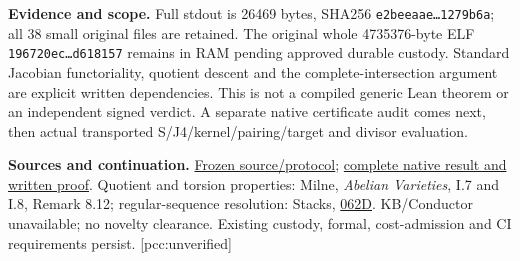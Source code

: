 \documentclass[10pt,a4paper]{article}
\begin{document}
\textbf{Evidence and scope.} Full stdout is 26469 bytes, SHA256
\texttt{e2beeaae\ldots1279b6a}; all 38 small original files are retained.
The original whole 4735376-byte ELF
\texttt{196720ec\ldots{}d618157} remains in RAM pending approved durable
custody. Standard Jacobian functoriality, quotient descent and the
complete-intersection argument are explicit written dependencies.
This is not a compiled generic Lean theorem or an independent signed
verdict. A separate native certificate audit comes next, then actual
transported S/J4/kernel/pairing/target and divisor evaluation.

\textbf{Sources and continuation.}
\href{https://github.com/isogeny-labs/crypto/tree/575953011ab00e509dd7c25beeaa45e17397c575/research/chained_cm19_3torsion_divisors_20261123}{Frozen source/protocol};
\href{https://github.com/isogeny-labs/crypto/tree/1b04550ed1131174198784468df884807b2d884b/research/chained_cm19_3torsion_divisors_20261123}{complete native result and written proof}.
Quotient and torsion properties: Milne, \emph{Abelian Varieties}, I.7 and I.8, Remark 8.12;
regular-sequence resolution: Stacks, \href{https://stacks.math.columbia.edu/tag/062D}{062D}.
KB/Conductor unavailable; no novelty clearance. Existing custody,
formal, cost-admission and CI requirements persist. [pcc:unverified]
\end{document}
